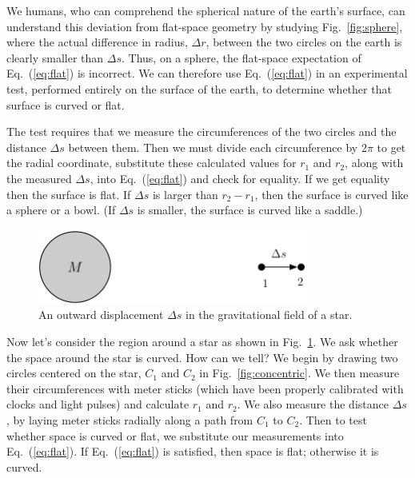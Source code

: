 We humans, who can comprehend the spherical nature of the earth's
surface, can understand this deviation from flat-space geometry by
studying Fig.~\ref{fig:sphere}, where the actual difference in radius,
$\Delta r$, between the two circles on the earth is clearly smaller
than $\Delta s$.  Thus, on a sphere, the flat-space expectation of
Eq.~(\ref{eq:flat}) is incorrect.  We can therefore use
Eq.~(\ref{eq:flat}) in an experimental test, performed entirely on the
surface of the earth, to determine whether that surface is curved or
flat.
     
The test requires that we measure the circumferences of the two
circles and the distance $\Delta s$ between them.  Then we must divide
each circumference by $2\pi$ to get the radial coordinate, substitute
these calculated values for $r_1$ and $r_2$, along with the measured
$\Delta s$, into Eq.~(\ref{eq:flat}) and check for equality.  If we
get equality then the surface is flat.  If $\Delta s$ is larger than
$r_2-r_1$, then the surface is curved like a sphere or a bowl.  (If
$\Delta s$ is smaller, the surface is curved like a saddle.)

\begin{figure}[tbp]
\begin{center}
\includegraphics[width=3.5in]{gravity_and_geometry/grav-photon.pdf}
\end{center}
\caption{An outward displacement $\Delta s$ in the gravitational field
  of a star.}
\label{fig:grav-photon}
\end{figure}
     
Now let's consider the region around a star as shown in
Fig.~\ref{fig:grav-photon}.  We ask whether the space around the star
is curved.  How can we tell?  We begin by drawing two circles centered
on the star, $C_1$ and $C_2$ in Fig.~\ref{fig:concentric}.  We then
measure their circumferences with meter sticks (which have been
properly calibrated with clocks and light pulses) and calculate $r_1$
and $r_2$.  We also measure the distance $\Delta s$, by laying meter
sticks radially along a path from $C_1$ to $C_2$.  Then to test
whether space is curved or flat, we substitute our measurements into
Eq.~(\ref{eq:flat}).  If Eq.~(\ref{eq:flat}) is satisfied, then space
is flat; otherwise it is curved.
         


